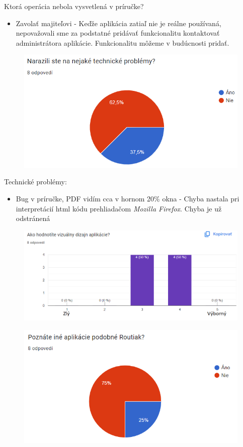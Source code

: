 \indent Ktorá operácia nebola vysvetlená v príručke?
\begin{itemize}
  \item Zavolať majiteľovi - Keďže aplikácia zatiaľ nie je reálne používaná, nepovažovali sme za podstatné pridávať funkcionalitu kontaktovať administrátora aplikácie. Funkcionalitu môžeme v budúcnosti pridať.
\end{itemize}
\begin{figure}[H]
  \centering
  \includegraphics[width=.7\textwidth]{img/dotaznik/6.png}
\end{figure}
\indent Technické problémy:
\begin{itemize}
  \item Bug v príručke, PDF vidím cca v hornom 20\% okna - Chyba nastala pri interpretácií \acrshort{html} kódu prehliadačom \textit{Mozilla Firefox}. Chyba je už odstránená
\end{itemize}
\begin{figure}[H]
  \centering
  \includegraphics[width=.7\textwidth]{img/dotaznik/8.png}
\end{figure}
\begin{figure}[H]
  \centering
  \includegraphics[width=.7\textwidth]{img/dotaznik/9.png}
\end{figure}
